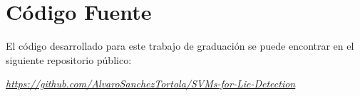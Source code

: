 \chapter{Código Fuente}
El código desarrollado para este trabajo de graduación se puede encontrar en el siguiente repositorio público:

\underline{\textit{https://github.com/AlvaroSanchezTortola/SVMs-for-Lie-Detection}}

\textcolor{white}{ \cite{Thai2012} \cite{Boser1992} \cite{Wolpe2010}  \cite{Chih-WeiHsuChih-ChungChang2008} \cite{Tzotsos2006} \cite{Davatzikos2005} \cite{Revell2004} \cite{EPOC2003} \cite{EMOTIV2014} \cite{Umale2016} \cite{Russell2010} \cite{Belmonte2007} \cite{Alpaydn2014} \cite{Aydemir2013} \cite{James1985} \cite{Vicianova2015} \cite{Ekman2009} }